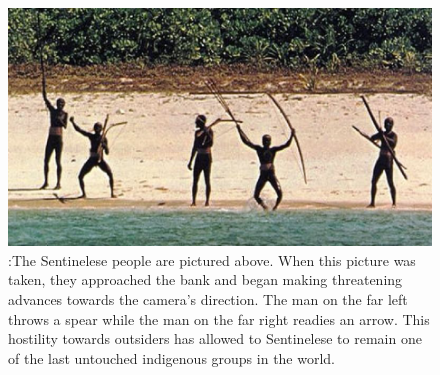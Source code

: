 \documentclass{book}\usepackage{knitr}
\begin{document}
\begin{figure}
\includegraphics[width=\linewidth]{images/sentpeeps}
\caption{:The Sentinelese people are pictured above. When this picture was taken, they approached the bank and began making threatening advances towards the camera’s direction. The man on the far left throws a spear while the man on the far right readies an arrow. This hostility towards outsiders has allowed to Sentinelese to remain one of the last untouched indigenous groups in the world.}
\label{fig:An Interaction with The Sentinelese People }
\end{figure}
\end{document}
